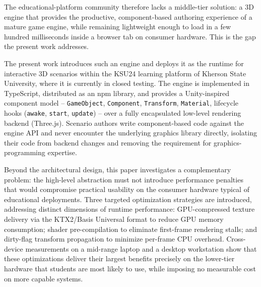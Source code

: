 The educational-platform community therefore lacks a middle-tier solution: a 3D engine that provides the productive, component-based authoring experience of a mature game engine, while remaining lightweight enough to load in a few hundred milliseconds inside a browser tab on consumer hardware. This is the gap the present work addresses.

The present work introduces such an engine and deploys it as the runtime for interactive 3D scenarios within the KSU24 learning platform of Kherson State University, where it is currently in closed testing. The engine is implemented in TypeScript, distributed as an npm library, and provides a Unity-inspired component model -- \texttt{GameObject}, \texttt{Component}, \texttt{Transform}, \texttt{Material}, lifecycle hooks (\texttt{awake}, \texttt{start}, \texttt{update}) -- over a fully encapsulated low-level rendering backend (Three.js). Scenario authors write component-based code against the engine API and never encounter the underlying graphics library directly, isolating their code from backend changes and removing the requirement for graphics-programming expertise.

Beyond the architectural design, this paper investigates a complementary problem: the high-level abstraction must not introduce performance penalties that would compromise practical usability on the consumer hardware typical of educational deployments. Three targeted optimization strategies are introduced, addressing distinct dimensions of runtime performance: GPU-compressed texture delivery via the KTX2/Basis Universal format to reduce GPU memory consumption; shader pre-compilation to eliminate first-frame rendering stalls; and dirty-flag transform propagation to minimize per-frame CPU overhead. Cross-device measurements on a mid-range laptop and a desktop workstation show that these optimizations deliver their largest benefits precisely on the lower-tier hardware that students are most likely to use, while imposing no measurable cost on more capable systems.

